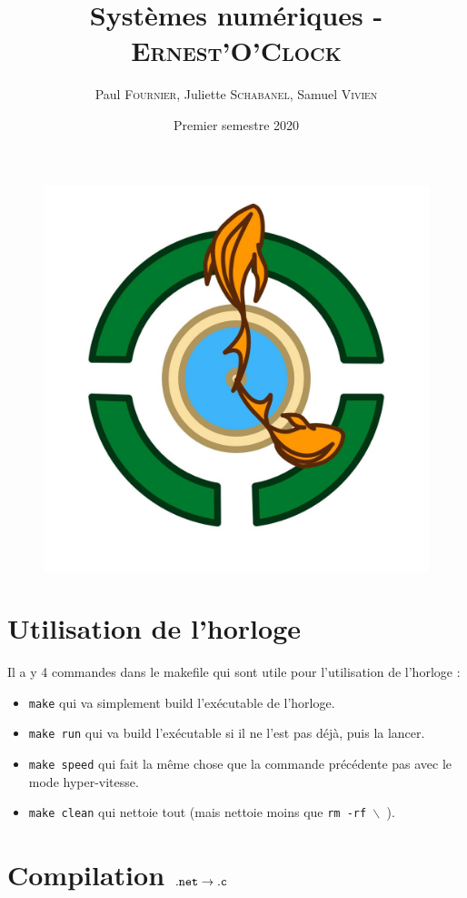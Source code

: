 \documentclass[10pt,a4paper,notitlepage ]{article}
\title{Systèmes numériques - \textsc{Ernest'O'Clock}}
\date{Premier semestre 2020}
\author{Paul \textsc{Fournier}, Juliette \textsc{Schabanel}, Samuel \textsc{Vivien}}
\begin{document}
	\maketitle
	
	\begin{figure}[h]
		\centering
		\includegraphics[width=0.7\linewidth]{logo}
	\end{figure}
	
	\pagebreak
	
	\tableofcontents
	\pagebreak
	
	\section{Utilisation de l'horloge}

		Il a y 4 commandes dans le makefile qui sont utile pour l'utilisation de l'horloge :

		\begin{itemize}
			\item \texttt{make} qui va simplement build l'exécutable de l'horloge.
			\item \texttt{make run} qui va build l'exécutable si il ne l'est pas déjà, puis la lancer.
			\item \texttt{make speed} qui fait la même chose que la commande précédente pas avec le mode hyper-vitesse.
			\item \texttt{make clean} qui nettoie tout (mais nettoie moins que \texttt{rm -rf $\backslash$ }).
		\end{itemize}

	\section{Compilation $\tt{.net} \rightarrow \tt{.c}$}
	
\end{document}
